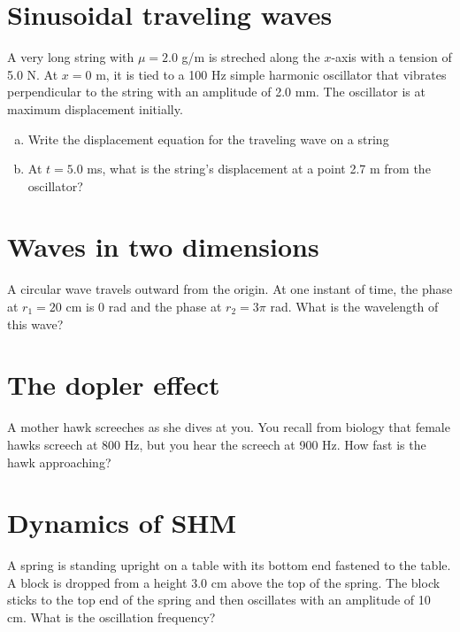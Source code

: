 \documentclass[11pt]{article}
\begin{document}
\section{Sinusoidal traveling waves}
A very long string with $\mu = 2.0$ g/m is streched along the $x$-axis with a tension of 5.0 N. At $x=0$ m, it is tied to a 100 Hz simple harmonic oscillator that vibrates perpendicular to the string with an amplitude of 2.0 mm. The oscillator is at maximum displacement initially.

\begin{enumerate}[(a)]
	\item Write the displacement equation for the traveling wave on a string
	\item At $t = 5.0$ ms, what is the string's displacement at a point 2.7 m from the oscillator?
\end{enumerate}


\section{Waves in two dimensions}

A circular wave travels outward from the origin. At one instant of time, the phase at $r_1 = 20$ cm is $0$ rad and the phase at $r_2 = 3\pi$ rad. What is the wavelength of this wave?



\section{The dopler effect}

A mother hawk screeches as she dives at you. You recall from biology that female hawks screech at 800 Hz, but you hear the screech at 900 Hz. How fast is the hawk approaching?



\section{Dynamics of SHM}

A spring is standing upright on a table with its bottom end fastened to the table. A block is dropped from a height 3.0 cm above the top of the spring. The block sticks to the top end of the spring and then oscillates with an amplitude of 10 cm. What is the oscillation frequency?
\end{document}
